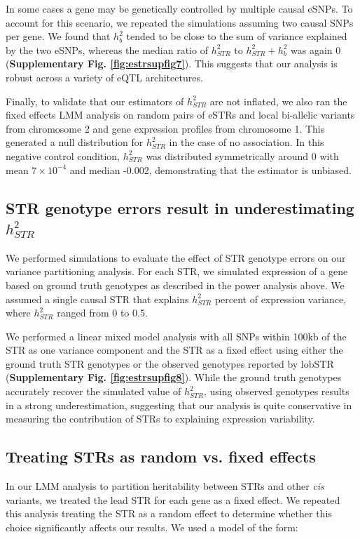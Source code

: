 In some cases a gene may be genetically controlled by multiple causal eSNPs. To account for this scenario, we repeated the simulations assuming two causal SNPs per gene. We found that $h^2_b$ tended to be close to the sum of variance explained by the two eSNPs, whereas the median ratio of $h^2_{STR}$ to $h^2_{STR}+h^2_{b}$ was again 0 (\textbf{Supplementary Fig. \ref{fig:estrsupfig7}}). This suggests that our analysis is robust across a variety of eQTL architectures.

Finally, to validate that our estimators of $h^2_{STR}$ are not inflated, we also ran the fixed effects LMM analysis on random pairs of eSTRs and local bi-allelic variants from chromosome 2 and gene expression profiles from chromosome 1. This generated a null distribution for $h^2_{STR}$ in the case of no association. In this negative control condition, $h^2_{STR}$ was distributed symmetrically around 0 with mean $7 \times 10^{-4}$ and median -0.002, demonstrating that the estimator is unbiased.

\subsection{STR genotype errors result in underestimating $h^2_{STR}$}

We performed simulations to evaluate the effect of STR genotype errors on our variance partitioning analysis. For each STR, we simulated expression of a gene based on ground truth genotypes as described in the power analysis above. We assumed a single causal STR that explains $h^2_{STR}$ percent of expression variance, where $h^2_{STR}$ ranged from 0 to 0.5. 

We performed a linear mixed model analysis with all SNPs within 100kb of the STR as one variance component and the STR as a fixed effect using either the ground truth STR genotypes or the observed genotypes reported by lobSTR (\textbf{Supplementary Fig. \ref{fig:estrsupfig8}}). While the ground truth genotypes accurately recover the simulated value of $h^2_{STR}$, using observed genotypes results in a strong underestimation, suggesting that our analysis is quite conservative in measuring the contribution of STRs to explaining expression variability.

\subsection{Treating STRs as random vs. fixed effects}
In our LMM analysis to partition heritability between STRs and other \emph{cis} variants, we treated the lead STR for each gene as a fixed effect. We repeated this analysis treating the STR as a random effect to determine whether this choice significantly affects our results. We used a model of the form:

